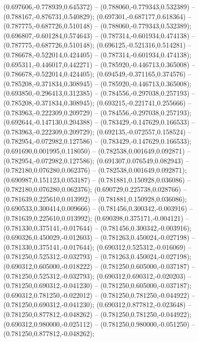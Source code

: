  (0.697606,-0.778939,0.645372) -- (0.788060,-0.779343,0.532389) -- (0.788167,-0.876731,0.540829);
 (0.697301,-0.687177,0.618364) -- (0.787775,-0.687726,0.510148) -- (0.788060,-0.779343,0.532389);
 (0.696807,-0.601284,0.574643) -- (0.787314,-0.601934,0.474138) -- (0.787775,-0.687726,0.510148);
 (0.696125,-0.521316,0.514281) -- (0.786678,-0.522014,0.424405) -- (0.787314,-0.601934,0.474138);
 (0.695311,-0.446017,0.442271) -- (0.785920,-0.446713,0.365008) -- (0.786678,-0.522014,0.424405);
 (0.694549,-0.371165,0.374576) -- (0.785208,-0.371834,0.308945) -- (0.785920,-0.446713,0.365008);
 (0.693850,-0.296413,0.312385) -- (0.784556,-0.297038,0.257193) -- (0.785208,-0.371834,0.308945);
 (0.693215,-0.221741,0.255666) -- (0.783963,-0.222309,0.209729) -- (0.784556,-0.297038,0.257193);
 (0.692644,-0.147130,0.204388) -- (0.783429,-0.147629,0.166533) -- (0.783963,-0.222309,0.209729);
 (0.692135,-0.072557,0.158524) -- (0.782954,-0.072982,0.127586) -- (0.783429,-0.147629,0.166533);
 (0.691690,0.001995,0.118050) -- (0.782538,0.001649,0.092871) -- (0.782954,-0.072982,0.127586);
 (0.691307,0.076549,0.082943) -- (0.782180,0.076280,0.062376) -- (0.782538,0.001649,0.092871);
 (0.690987,0.151123,0.053187) -- (0.781881,0.150928,0.036086) -- (0.782180,0.076280,0.062376);
 (0.690729,0.225738,0.028766) -- (0.781639,0.225610,0.013992) -- (0.781881,0.150928,0.036086);
 (0.690533,0.300414,0.009666) -- (0.781456,0.300342,-0.003916) -- (0.781639,0.225610,0.013992);
 (0.690398,0.375171,-0.004121) -- (0.781330,0.375141,-0.017644) -- (0.781456,0.300342,-0.003916);
 (0.690326,0.450029,-0.012603) -- (0.781263,0.450024,-0.027198) -- (0.781330,0.375141,-0.017644);
 (0.690312,0.525312,-0.016069) -- (0.781250,0.525312,-0.032793) -- (0.781263,0.450024,-0.027198);
 (0.690312,0.605000,-0.018222) -- (0.781250,0.605000,-0.037187) -- (0.781250,0.525312,-0.032793);
 (0.690312,0.690312,-0.020203) -- (0.781250,0.690312,-0.041230) -- (0.781250,0.605000,-0.037187);
 (0.690312,0.781250,-0.022012) -- (0.781250,0.781250,-0.044922) -- (0.781250,0.690312,-0.041230);
 (0.690312,0.877812,-0.023648) -- (0.781250,0.877812,-0.048262) -- (0.781250,0.781250,-0.044922);
 (0.690312,0.980000,-0.025112) -- (0.781250,0.980000,-0.051250) -- (0.781250,0.877812,-0.048262);
